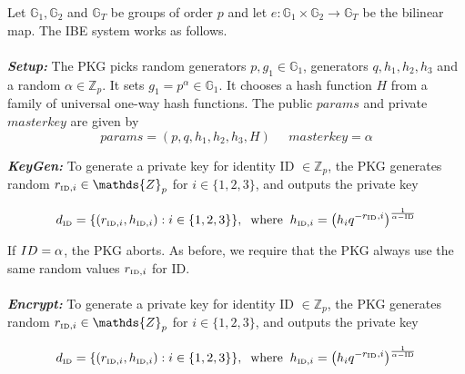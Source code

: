 \documentclass[11pt]{article}
\begin{document}
Let $\mathds{G}_1 , \mathds{G}_2$ and $\mathds{G}_T$ be groups of order $p$ and let $e : \mathds{G}_1 \times \mathds{G}_2 \rightarrow \mathds{G}_T$ be the bilinear map. The IBE system works as follows.\\
\\
\textbf{\textit{Setup:}} The PKG picks random generators $p, g_1 \in \mathds{G}_1$, generators $q, h_1, h_2, h_3$ and a random $\alpha \in \mathds{Z}_p$. It sets $g_1 = p^{\alpha} \in \mathds{G}_1$. It chooses a hash function $H$ from a family of universal one-way hash functions. The public $params$ and private $masterkey$ are given by
\begin{equation*}
 params = \left( p,q,h_1,h_2,h_3,H\right) \; \; \; \; \; masterkey = \alpha
\end{equation*}

\textbf{\textit{KeyGen:}} To generate a private key for identity ID $\in \mathds{Z}_p$, the PKG generates random $r_{\textrm{\tiny{ID}},i} \in \mathds{Z}_p$ for $i \in \{1,2,3\}$, and outputs the private key

\begin{equation*}
 d_{\textrm{\tiny{ID}}} = \{ \left( r_{\textrm{\tiny{ID}},i}, h_{\textrm{\tiny{ID}},i} \right) : i \in \{ 1, 2, 3\}\}, \; \; \textrm{where} \; \; h_{\textrm{\tiny{ID}},i} = \left( h_{i}q^{-r_{\textrm{\tiny{ID}}},i} \right)^{\frac{1}{\alpha-\textrm{\tiny{ID}}}}
\end{equation*}

If $\footnotesize{ID} = \alpha $, the PKG aborts. As before, we require that the PKG always use the same random values $r_{\textrm{\tiny{ID}},i}$ for ID.\\
\\
\textbf{\textit{Encrypt:}} To generate a private key for identity ID $\in \mathds{Z}_p$, the PKG generates random $r_{\textrm{\tiny{ID}},i} \in \mathds{Z}_p$ for $i \in \{1,2,3\}$, and outputs the private key

\begin{equation*}
 d_{\textrm{\tiny{ID}}} = \{ \left( r_{\textrm{\tiny{ID}},i}, h_{\textrm{\tiny{ID}},i} \right) : i \in \{ 1, 2, 3\}\}, \; \; \textrm{where} \; \; h_{\textrm{\tiny{ID}},i} = \left( h_{i}q^{-r_{\textrm{\tiny{ID}}},i} \right)^{\frac{1}{\alpha-\textrm{\tiny{ID}}}}
\end{equation*}
\end{document}
